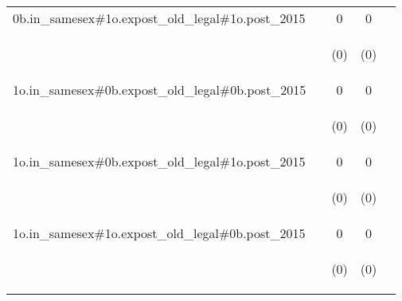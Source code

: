 \documentclass[]{article}
\begin{document}
\begin{center}
\begin{tabular}{lcccc}
0b.in\_samesex\#1o.expost\_old\_legal\#1o.post\_2015 &  & 0 & 0 &  \\
\vspace{4pt} & \begin{footnotesize}\end{footnotesize} & \begin{footnotesize}(0)\end{footnotesize} & \begin{footnotesize}(0)\end{footnotesize} & \begin{footnotesize}\end{footnotesize} \\
1o.in\_samesex\#0b.expost\_old\_legal\#0b.post\_2015 &  & 0 & 0 &  \\
\vspace{4pt} & \begin{footnotesize}\end{footnotesize} & \begin{footnotesize}(0)\end{footnotesize} & \begin{footnotesize}(0)\end{footnotesize} & \begin{footnotesize}\end{footnotesize} \\
1o.in\_samesex\#0b.expost\_old\_legal\#1o.post\_2015 &  & 0 & 0 &  \\
\vspace{4pt} & \begin{footnotesize}\end{footnotesize} & \begin{footnotesize}(0)\end{footnotesize} & \begin{footnotesize}(0)\end{footnotesize} & \begin{footnotesize}\end{footnotesize} \\
1o.in\_samesex\#1o.expost\_old\_legal\#0b.post\_2015 &  & 0 & 0 &  \\
\vspace{4pt} & \begin{footnotesize}\end{footnotesize} & \begin{footnotesize}(0)\end{footnotesize} & \begin{footnotesize}(0)\end{footnotesize} & \begin{footnotesize}\end{footnotesize} \\

\end{tabular}
\end{center}
\end{document}
